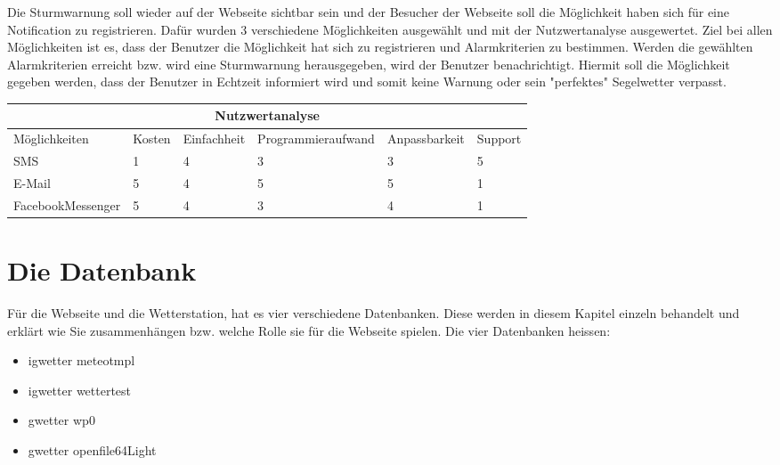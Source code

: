 \documentclass[a4paper,ngerman, 11pt, pagesize]{report}
\begin{document}
Die Sturmwarnung soll wieder auf der Webseite sichtbar sein und der Besucher der Webseite soll die Möglichkeit haben sich für eine Notification zu registrieren. Dafür wurden 3 verschiedene Möglichkeiten ausgewählt und mit der Nutzwertanalyse ausgewertet. Ziel bei allen Möglichkeiten ist es, dass der Benutzer die Möglichkeit hat sich zu registrieren und Alarmkriterien zu bestimmen. Werden die gewählten Alarmkriterien erreicht bzw. wird eine Sturmwarnung herausgegeben, wird der Benutzer benachrichtigt. Hiermit soll die Möglichkeit gegeben werden, dass der Benutzer in Echtzeit informiert wird und somit keine Warnung oder sein "perfektes" Segelwetter verpasst.  

\begin{center}
\begin{tabular}{ |p{3.5cm}||p{1cm}|p{2cm}|p{3.5cm}|p{2.5cm}|p{1.5cm}|}
 \hline
 \multicolumn{6}{|c|}{Nutzwertanalyse} \\
 \hline
	Möglichkeiten & Kosten & Einfachheit & Programmieraufwand & Anpassbarkeit & Support\\
 \hline
	SMS & 1 & 4 & 3 & 3 & 5 \\
	E-Mail & 5 & 4 & 5 & 5 & 1 \\
	FacebookMessenger & 5 & 4 & 3 & 4 & 1 \\
 
\hline
\end{tabular}
\end{center}




\section{Die Datenbank}
Für die Webseite und die Wetterstation, hat es vier verschiedene Datenbanken. Diese werden in diesem Kapitel einzeln behandelt und erklärt wie Sie zusammenhängen bzw. welche Rolle sie für die Webseite spielen. Die vier Datenbanken heissen:
\begin{itemize}  
\item igwetter meteotmpl
\item igwetter wettertest
\item gwetter wp0
\item gwetter openfile64Light
\end{itemize}
\end{document}
